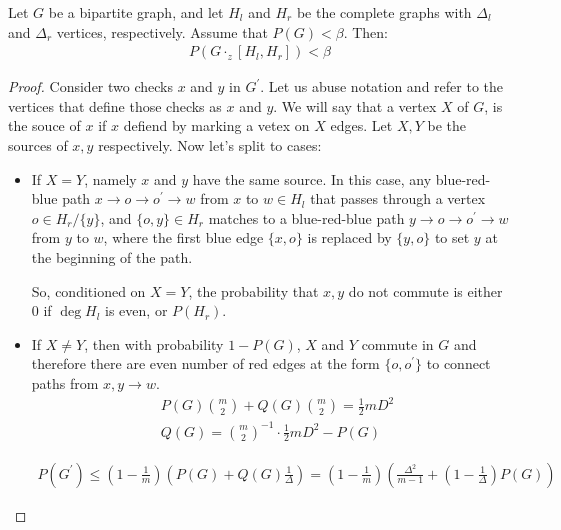 \documentclass[manuscript,screen,review]{acmart}
\begin{document}
\begin{claim}  
Let $G$ be a bipartite graph, and let $H_{l}$ and $H_{r}$ be the complete graphs with $\Delta_{l}$ and $\Delta_{r}$ vertices, respectively. Assume that $P(G) < \beta$. Then:
\begin{equation*}
  \begin{split}
      P(G \cdot_{z} [H_{l},H_{r}]) < \beta
  \end{split}
\end{equation*}
\end{claim}
\begin{proof}
  Consider two checks $x$ and $y$ in $G^{\prime}$. Let us abuse notation and refer to the vertices that define those checks as $x$ and $y$. We will say that a vertex $X$ of $G$, is the souce of $x$ if $x$ defiend by marking a vetex on $X$ edges. Let $X,Y$ be the sources of $x,y$ respectively. Now let's split to cases:
  \begin{itemize}
    \item If $X = Y$, namely $x$ and $y$ have the same source. In this case, any blue-red-blue path $x \rightarrow o \rightarrow o^{\prime} \rightarrow w$ from $x$ to $w \in H_{l}$ that passes through a vertex $o \in H_{r}/\{y\}$, and $\{o,y\} \in H_{r}$ matches to a blue-red-blue path $y \rightarrow o \rightarrow o^{\prime} \rightarrow w$ from $y$ to $w$, where the first blue edge $\{ x, o \}$ is replaced by $\{ y, o \}$ to set $y$ at the beginning of the path.
   
    So, conditioned on $X=Y$, the probability that $x,y$ do not commute is either $0$ if $\deg H_{l}$ is even, or $P(H_{r})$.
  \item {} If $X\neq Y$, then with probability $1 - P(G)$, $X$ and $Y$ commute in $G$ and therefore there are even number of red edges at the form $\{o , o^{\prime}\}$ to connect paths from $x,y \rightarrow w$.     
    \begin{equation*}
      \begin{split}
        & P(G){ m \choose 2} + Q(G){ m \choose 2} = \frac{1}{2}m D^{2} \\ 
        & Q(G) = { m \choose 2 }^{-1}\cdot \frac{1}{2}mD^{2} - P(G)
      \end{split}
    \end{equation*}
    
    \begin{equation*}
      \begin{split}
        P(G^{\prime}) \le \left( 1 - \frac{1}{m} \right) \left( P(G) + Q(G)  \frac{1}{\Delta} \right) = \left( 1 - \frac{1}{m} \right) \left(  \frac{\Delta^{2}}{m-1} + \left( 1 -  \frac{1}{\Delta}\right)P(G) \right)
      \end{split}
    \end{equation*}
  \end{itemize}
\end{proof}
\end{document}

